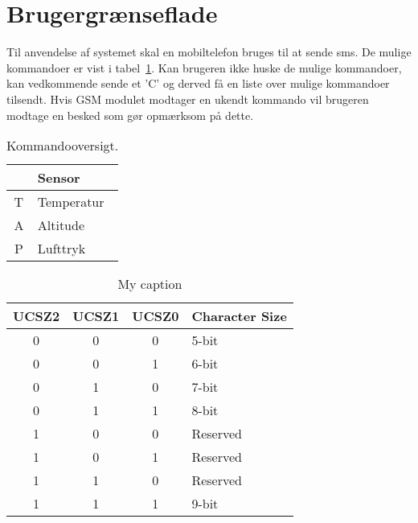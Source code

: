 \section{Brugergrænseflade}

Til anvendelse af systemet skal en mobiltelefon bruges til at sende sms. De mulige kommandoer er vist i tabel~\ref{tab:commands}. Kan brugeren ikke huske de mulige kommandoer, kan vedkommende sende et 'C' og derved få en liste over mulige kommandoer tilsendt. Hvis GSM modulet modtager en ukendt kommando vil brugeren modtage en besked som gør opmærksom på dette.

\vskip0.5cm

\begin{table}[h]
	\centering
	\begin{tabular}{|c|l|}
		\hline
		\rowcolor[HTML]{EFEFEF} 
		\multicolumn{1}{|l|}{\cellcolor[HTML]{EFEFEF}\textbf{SMS}} & \textbf{Sensor}	\\ 	\hline
		T & Temperatur	\\ 	\hline
		A & Altitude	\\ 	\hline
		P & Lufttryk	\\ 	\hline
	\end{tabular}
	\caption{Kommandooversigt.}
	\label{tab:commands}
\end{table}

\begin{table}[]
	\centering
	\begin{tabular}{|c|c|c|l|}
		\hline
		\rowcolor[HTML]{EFEFEF} 
		\textbf{UCSZ2} & \textbf{UCSZ1} & \textbf{UCSZ0} & \textbf{Character Size} \\ \hline
		0 & 0 & 0 & 5-bit \\ \hline
		0 & 0 & 1 & 6-bit \\ \hline
		0 & 1 & 0 & 7-bit \\ \hline
		0 & 1 & 1 & 8-bit \\ \hline
		1 & 0 & 0 & Reserved \\ \hline
		1 & 0 & 1 & Reserved \\ \hline
		1 & 1 & 0 & Reserved \\ \hline
		1 & 1 & 1 & 9-bit \\ \hline
	\end{tabular}
	\caption{My caption}
	\label{my-label}
\end{table}
